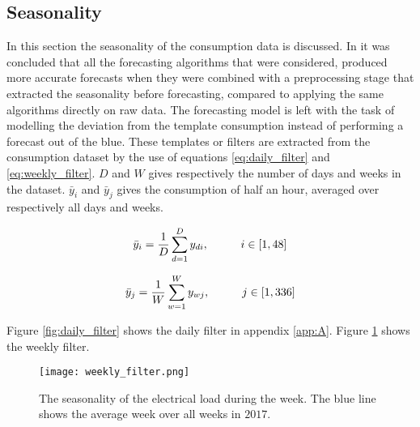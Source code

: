  


\subsection{Seasonality}
In this section the seasonality of the consumption data is discussed. In \cite{Hoverstad2015}it was concluded that all the forecasting algorithms that were considered, produced more accurate forecasts when they were combined with a preprocessing stage that extracted the seasonality before forecasting, compared to applying the same algorithms directly on raw data. The forecasting model is left with the task of modelling the deviation from the template consumption instead of performing a forecast out of the blue. These templates or filters are extracted from the consumption dataset by the use of equations \ref{eq:daily_filter} and \ref{eq:weekly_filter}. $ D $ and $ W $ gives respectively the number of days and weeks in the dataset. $\bar{y}_i$ and $\bar{y}_j$ gives the consumption of half an hour, averaged over respectively all days and weeks. 

\begin{equation}\label{eq:daily_filter}
	\bar{y}_i = \frac{1}{D} \sum_{d=1}^D y_{di}, \hspace{10mm} i \in [1,48]
\end{equation} 

\begin{equation}\label{eq:weekly_filter}
	\bar{y}_j = \frac{1}{W} \sum_{w=1}^W y_{wj}, \hspace{10mm}  j \in [1,336]
\end{equation} 



Figure \ref{fig:daily_filter} shows the daily filter in appendix \ref{app:A}. Figure \ref{fig:weekly_filter} shows the weekly filter.

\begin{figure}[h!]
	\centering
	\texttt{[image: weekly\_filter.png]}
	\caption{The seasonality of the electrical load during the week. The blue line shows the average week over all weeks in $ 2017 $. }
	\label{fig:weekly_filter}
\end{figure}

